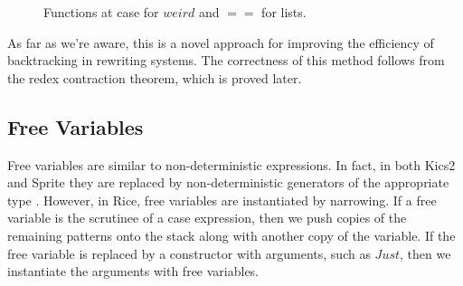 \documentclass{book}
\theoremstyle{definition}
\newcommand{\Conid}[1]{\mathit{#1}}
\newcommand{\Varid}[1]{\mathit{#1}}
\def\resethooks{%
  \global\let\SaveRestoreHook\empty
  \global\let\ColumnHook\empty}
\newlength{\blanklineskip}
\begin{document}
\begin{figure}
\resethooks
\caption{Functions at case for \ensuremath{\Varid{weird}} and \ensuremath{\Varid{==}} for lists.}
\label{fig:caseFuncs}
\end{figure}



As far as we're aware, this is a novel approach for improving the efficiency of backtracking
in rewriting systems.
The correctness of this method follows 
from the redex contraction theorem, which is proved later.


\subsection{Free Variables} \label{Free Variables}

Free variables are similar to non-deterministic expressions.
In fact, in both Kics2 and Sprite \cite{kics2,sprite} they are replaced
by non-deterministic generators of the appropriate type \cite{OverlappingRules}.
However, in Rice, free variables are instantiated by narrowing.
If a free variable is the scrutinee of a case expression, then 
we push copies of the remaining patterns onto the stack along with another 
copy of the variable.
If the free variable is replaced by a constructor with arguments, such as \ensuremath{\Conid{Just}},
then we instantiate the arguments with free variables.
\end{document}
